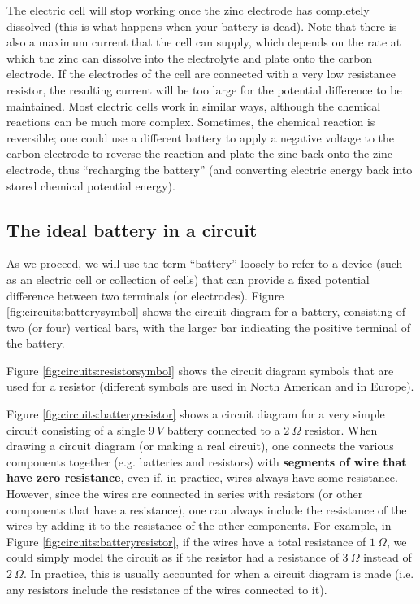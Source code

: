 The electric cell will stop working once the zinc electrode has completely dissolved (this is what happens when your battery is dead). Note that there is also a maximum current that the cell can supply, which depends on the rate at which the zinc can dissolve into the electrolyte and plate onto the carbon electrode. If the electrodes of the cell are connected with a very low resistance resistor, the resulting current will be too large for the potential difference to be maintained. Most electric cells work in similar ways, although the chemical reactions can be much more complex. Sometimes, the chemical reaction is reversible; one could use a different battery to apply a negative voltage to the carbon electrode to reverse the reaction and plate the zinc back onto the zinc electrode, thus ``recharging the battery'' (and converting electric energy back into stored chemical potential energy). 

\subsection{The ideal battery in a circuit}
As we proceed, we will use the term ``battery'' loosely to refer to a device (such as an electric cell or collection of cells) that can provide a fixed potential difference between two terminals (or electrodes). Figure \ref{fig:circuits:batterysymbol} shows the circuit diagram for a battery, consisting of two (or four) vertical bars, with the larger bar indicating the positive terminal of the battery.


Figure \ref{fig:circuits:resistorsymbol} shows the circuit diagram symbols that are used for a resistor (different symbols are used in North American and in Europe).


Figure \ref{fig:circuits:batteryresistor} shows a circuit diagram for a very simple circuit consisting of a single $\SI{9}{V}$ battery connected to a $\SI{2}{\Omega}$ resistor. When drawing a circuit diagram (or making a real circuit), one connects the various components together (e.g. batteries and resistors) with \textbf{segments of wire that have zero resistance}, even if, in practice, wires always have some resistance. However, since the wires are connected in series with resistors (or other components that have a resistance), one can always include the resistance of the wires by adding it to the resistance of the other components. For example, in Figure \ref{fig:circuits:batteryresistor}, if the wires have a total resistance of $\SI{1}{\Omega}$, we could simply model the circuit as if the resistor had a resistance of $\SI{3}{\Omega}$ instead of $\SI{2}{\Omega}$. In practice, this is usually accounted for when a circuit diagram is made (i.e. any resistors include the resistance of the wires connected to it). 

